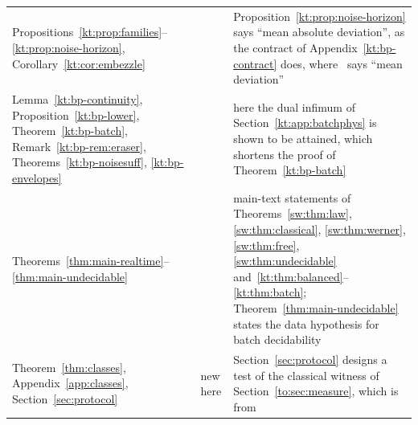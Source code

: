 \begin{small}
\begin{longtable}{@{}>{\raggedright\arraybackslash}p{}>{\raggedright\arraybackslash}p{}>{\raggedright\arraybackslash}p{}@{}}
Propositions~\ref{kt:prop:families}--\ref{kt:prop:noise-horizon}, Corollary~\ref{kt:cor:embezzle} & \cite[Props.~11--16, Cor.~17]{KeepingTime} & Proposition~\ref{kt:prop:noise-horizon} says ``mean absolute deviation'', as the contract of Appendix~\ref{kt:bp-contract} does, where~\cite[Prop.~16]{KeepingTime} says ``mean deviation''\\
Lemma~\ref{kt:bp-continuity}, Proposition~\ref{kt:bp-lower}, Theorem~\ref{kt:bp-batch}, Remark~\ref{kt:bp-rem:eraser}, Theorems~\ref{kt:bp-noisesuff}, \ref{kt:bp-envelopes} & \cite[Lemma~18, Prop.~19, Thm.~20, Remark~1, Thms.~21, 22]{KeepingTime} & here the dual infimum of Section~\ref{kt:app:batchphys} is shown to be attained, which shortens the proof of Theorem~\ref{kt:bp-batch}\\
Theorems~\ref{thm:main-realtime}--\ref{thm:main-undecidable} & \cite{SaveWork,KeepingTime} & main-text statements of Theorems~\ref{sw:thm:law}, \ref{sw:thm:classical}, \ref{sw:thm:werner}, \ref{sw:thm:free}, \ref{sw:thm:undecidable} and~\ref{kt:thm:balanced}--\ref{kt:thm:batch}; Theorem~\ref{thm:main-undecidable} states the data hypothesis for batch decidability\\
Theorem~\ref{thm:classes}, Appendix~\ref{app:classes}, Section~\ref{sec:protocol} & new here & Section~\ref{sec:protocol} designs a test of the classical witness of Section~\ref{to:sec:measure}, which is from~\cite[Sec.~8]{Order}\\
\end{longtable}
\end{small}
